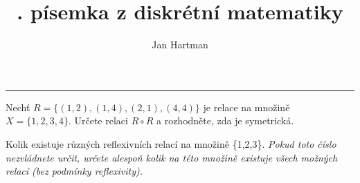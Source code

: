 \documentclass[10pt]{article}
\title{\tutnum. písemka z diskrétní matematiky}
\author{Jan Hartman}
\newcommand{\titlerule}{%
    \noindent %
    \makebox[\textwidth]{\large \thetitle \hfill Jméno: \hspace{4cm}}
    \rule{\textwidth}{0.4pt}%
}
\begin{document}
\titlerule

\begin{problem}[5 bodů]
Nechť $R=\{(1,2),(1,4),(2,1),(4,4)\}$ je relace na množině $X=\{1,2,3,4\}$. Určete relaci $R \circ R$ a rozhodněte, zda je symetrická.
\end{problem}

\begin{problem}[5 bodů]

Kolik existuje různých reflexivních relací na množině \{1,2,3\}. \textit{Pokud toto číslo nezvládnete určit, určete alespoň kolik na této množině existuje všech možných relací (bez podmínky reflexivity).}

\end{problem}
\end{document}
